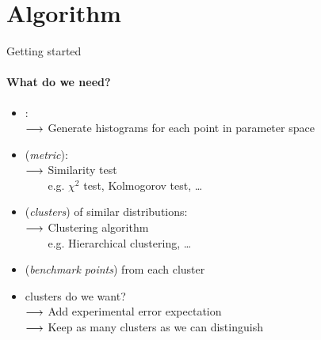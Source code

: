 \section{Algorithm}

\begin{frame}[t]{Getting started}
    \framesubtitle{What do we need?}
	
    \begin{itemize}
   	\item<+->{
   		:\\
   		$\longrightarrow$ Generate histograms for each point in parameter space
   	}

    \item<+->{
    	\bigskip
         {\color{purple}(\emph{metric})}:\\
    	$\longrightarrow$ Similarity test\\
        $\phantom{\lra}$ {\small e.g. $\chi^2$ test, Kolmogorov test, \dots}
	}
    
    \item<+->{
    	\bigskip
    	 {\color{purple}(\emph{clusters})} of similar distributions:\\
    	$\longrightarrow$ Clustering algorithm\\
        $\phantom{\lra}$ {\small e.g. Hierarchical clustering, \dots}
    }
    
    \item<+->{
        \bigskip
         {\color{purple}(\emph{benchmark points})} from each cluster
    }
    
    \item<+->{
    	\bigskip
    	 clusters do we want?\\
    	$\longrightarrow$ Add experimental error expectation\\
    	$\longrightarrow$ Keep as many clusters as we can distinguish
    }
    \end{itemize}
\end{frame}

